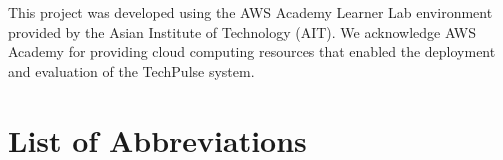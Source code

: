 \documentclass[12pt,a4paper]{report}
\begin{document}
This project was developed using the AWS Academy Learner Lab environment provided by the Asian Institute of Technology (AIT). We acknowledge AWS Academy for providing cloud computing resources that enabled the deployment and evaluation of the TechPulse system.

\newpage\tableofcontents
\newpage{}\listoftables
\newpage{}\listoffigures

\newpage
\chapter*{List of Abbreviations}
\end{document}
